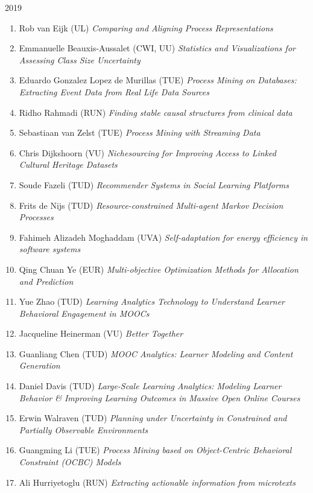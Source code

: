 \begin{multicols}{2}
\begin{scriptsize}
\vspace{0.2cm}
2019
\vspace{0.2cm}
\begin{enumerate}[leftmargin=*,noitemsep,topsep=0pt,parsep=1pt,partopsep=0pt]
\renewcommand{\labelenumi}{2019-\arabic{enumi}}
\item Rob van Eijk (UL)	\textit{Comparing and Aligning Process Representations}
\item Emmanuelle Beauxis-Aussalet (CWI, UU) \textit{Statistics and Visualizations for Assessing Class Size Uncertainty}
\item Eduardo Gonzalez Lopez de Murillas (TUE) \textit{Process Mining on Databases: Extracting Event Data from Real Life Data Sources}
\item Ridho Rahmadi (RUN) \textit{Finding stable causal structures from clinical data}
\item Sebastiaan van Zelst (TUE) \textit{Process Mining with Streaming Data}
\item Chris Dijkshoorn (VU) \textit{Nichesourcing for Improving Access to Linked Cultural Heritage Datasets}
\item Soude Fazeli (TUD) \textit{Recommender Systems in Social Learning Platforms}
\item Frits de Nijs (TUD) \textit{Resource-constrained Multi-agent Markov Decision Processes}
\item Fahimeh Alizadeh Moghaddam (UVA) \textit{Self-adaptation for energy efficiency in software systems}
\item Qing Chuan Ye (EUR) \textit{Multi-objective Optimization Methods for Allocation and Prediction}
\item Yue Zhao (TUD) \textit{Learning Analytics Technology to Understand Learner Behavioral Engagement in MOOCs}
\item Jacqueline Heinerman (VU) \textit{Better Together}
\item Guanliang Chen (TUD) \textit{MOOC Analytics: Learner Modeling and Content Generation}
\item Daniel Davis (TUD) \textit{Large-Scale Learning Analytics: Modeling Learner Behavior \& Improving Learning Outcomes in Massive Open Online Courses}
\item Erwin Walraven (TUD) \textit{Planning under Uncertainty in Constrained and Partially Observable Environments}
\item Guangming Li (TUE) \textit{Process Mining based on Object-Centric Behavioral Constraint (OCBC) Models}
\item Ali Hurriyetoglu (RUN) \textit{Extracting actionable information from microtexts}

\end{enumerate}
\end{scriptsize}
\end{multicols}
